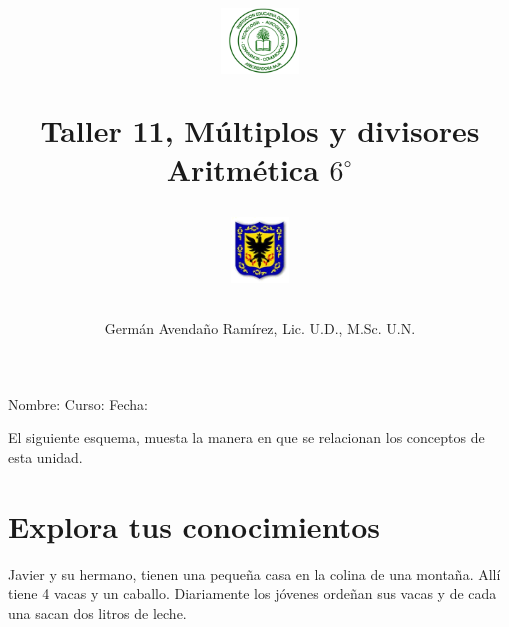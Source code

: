 \documentclass[10pt,twoside]{article}
\author{Germ\'an Avenda\~no Ram\'irez, Lic. U.D., M.Sc. U.N.}
\title{\begin{minipage}{.2\textwidth}
\includegraphics[height=1.75cm]{Images/logo-colegio.png}\end{minipage}
\begin{minipage}{.55\textwidth}
\begin{center}
Taller 11, Múltiplos y divisores \\
Aritmética $6^{\circ}$
\end{center}
\end{minipage}\hfill
\begin{minipage}{.2\textwidth}
\includegraphics[height=1.75cm]{Images/logo-sed.png} 
\end{minipage}}
\date{}
\begin{document}
\maketitle
Nombre: \hrulefill Curso: \underline{\hspace*{44pt}} Fecha: \underline{\hspace*{2.5cm}}\\

\begin{minipage}{.3\textwidth}
El siguiente esquema, muesta la manera en que se relacionan los conceptos de esta unidad.
\section*{Explora tus conocimientos}
Javier y su hermano, tienen una pequeña casa en la colina de una montaña. Allí tiene 4 vacas y un caballo. Diariamente los jóvenes ordeñan sus vacas y de cada una sacan dos litros de leche.
\end{minipage}
\end{document}
